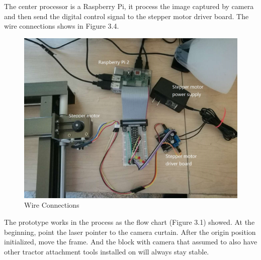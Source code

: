\documentclass[letterpaper,12pt,oneside]{book}
\begin{document}
		The center processor is a Raspberry Pi, it process the image captured by camera and then send the digital control signal to the stepper motor driver board. The wire connections shows in Figure 3.4.
		\begin{figure}[ht!]
			\begin{center}
				\includegraphics[scale = 0.4]{connection.jpg}
				\caption{Wire Connections}
			\end{center}
		\end{figure}
		The prototype works in the process as the flow chart (Figure 3.1) showed. At the beginning, point the laser pointer to the camera curtain. After the origin position initialized, move the frame. And the block with camera that assumed to also have other tractor attachment tools installed on will always stay stable. 
		
		
\end{document}

